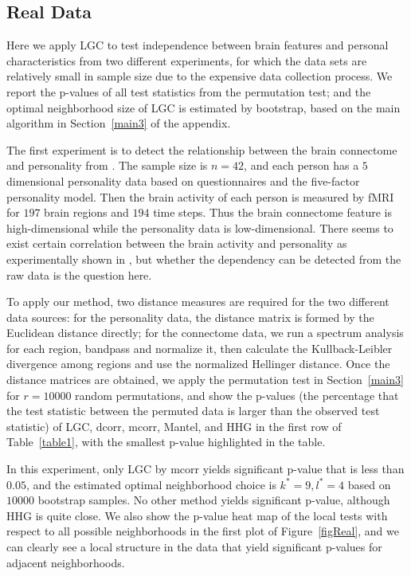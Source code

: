 \documentclass[11pt]{article}
\begin{document}
\subsection{Real Data}
\label{numer3}
Here we apply LGC to test independence between brain features and personal characteristics from two different experiments, for which the data sets are relatively small in sample size due to the expensive data collection process. We report the p-values of all test statistics from the permutation test; and the optimal neighborhood size of LGC is estimated by bootstrap, based on the main algorithm in Section~\ref{main3} of the appendix.

The first experiment is to detect the relationship between the brain connectome and personality from \cite{AdelsteinEtAl2011}. The sample size is $n=42$, and each person has a $5$ dimensional personality data based on questionnaires and the five-factor personality model. Then the brain activity of each person is measured by fMRI for $197$ brain regions and $194$ time steps. Thus the brain connectome feature is high-dimensional while the personality data is low-dimensional. There seems to exist certain correlation between the brain activity and personality as experimentally shown in \cite{AdelsteinEtAl2011}, but whether the dependency can be detected from the raw data is the question here.

To apply our method, two distance measures are required for the two different data sources: for the personality data, the distance matrix is formed by the Euclidean distance directly; for the connectome data, we run a spectrum analysis for each region, bandpass and normalize it, then calculate the Kullback-Leibler divergence among regions and use the normalized Hellinger distance. Once the distance matrices are obtained, we apply the permutation test in Section~\ref{main3} for $r=10000$ random permutations, and show the p-values (the percentage that the test statistic between the permuted data is larger than the observed test statistic) of LGC, dcorr, mcorr, Mantel, and HHG in the first row of Table~\ref{table1}, with the smallest p-value highlighted in the table.

In this experiment, only LGC by mcorr yields significant p-value that is less than $0.05$, and the estimated optimal neighborhood choice is $k^{*}=9, l^{*}=4$ based on $10000$ bootstrap samples. No other method yields significant p-value, although HHG is quite close. We also show the p-value heat map of the local tests with respect to all possible neighborhoods in the first plot of Figure~\ref{figReal}, and we can clearly see a local structure in the data that yield significant p-values for adjacent neighborhoods.
\end{document}
